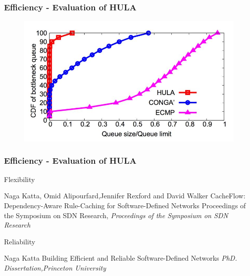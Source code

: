 \documentclass{beamer}
\begin{document}
   
    \begin{frame}
    	\frametitle{Efficiency - Evaluation of HULA}
    	
    	\begin{figure}
    		\includegraphics[width=1.05\linewidth]{22}
    	\end{figure}
    \end{frame}
    
   \begin{frame}
   	\frametitle{Efficiency - Evaluation of HULA}
   	Flexibility
   	\footnotesize{
   		\begin{thebibliography}{99} %
   			 Naga Katta, Omid Alipourfard,Jennifer Rexford and David Walker 
   			\newblock CacheFlow: Dependency-Aware Rule-Caching for Software-Defined Networks
   			Proceedings of the Symposium on SDN Research,
   			\newblock \emph{Proceedings of the Symposium on SDN Research}
   		\end{thebibliography}
   	}
   	Reliability
   	\footnotesize{
   		\begin{thebibliography}{99} %
   			 Naga Katta
   			\newblock Building Efficient and Reliable Software-Defined Networks
   			\newblock \emph{ PhD. Dissertation,Princeton University}
   		\end{thebibliography}
   	}
   \end{frame}
   
   
\end{document}
